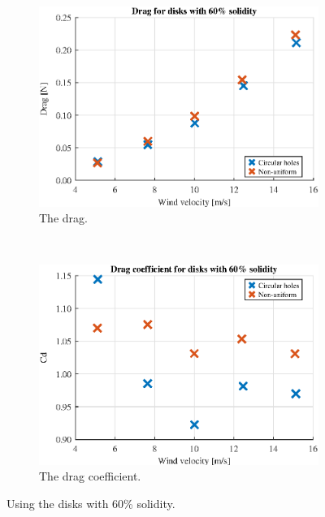 \begin{figure} [h!]
    \centering
    \begin{subfigure}[b]{0.45\linewidth}
        \includegraphics[width=\textwidth]{0_Images/SixtyDrag.eps}
        \caption{The drag.}
        \label{Fig:SixtyDrag}
    \end{subfigure}
    ~
    \begin{subfigure}[b]{0.45\linewidth}
        \includegraphics[width=\textwidth]{0_Images/SixtyCD.eps}
        \caption{The drag coefficient.}
        \label{Fig:SixtyCD}
    \end{subfigure}
    \caption{Using the disks with 60\% solidity.}
    \label{fig:SixtyDisk}
\end{figure}


